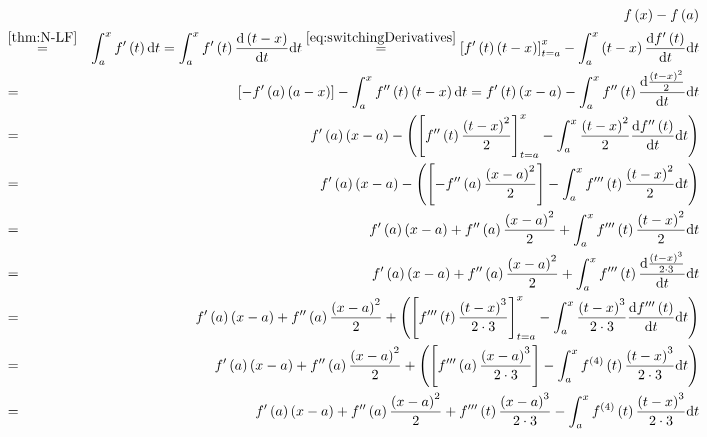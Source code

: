 \documentclass[
]{book}
\theoremstyle{definition}
\theoremstyle{definition}
\theoremstyle{definition}
\theoremstyle{definition}
\theoremstyle{remark}
\begin{document}
\begin{eqnarray}
 &  & f\left(x\right)-f\left(a\right)\\
 & \overset{\ref{thm:N-LF}}{=} & \int_{a}^{x}f'\left(t\right)\mathrm{d}t=\int_{a}^{x}f'\left(t\right)\frac{\mathrm{d}\left(t-x\right)}{\mathrm{d}t}\mathrm{d}t\overset{\ref{eq:switchingDerivatives}}{=}\left[f'\left(t\right)\left(t-x\right)\right]_{t=a}^{x}-\int_{a}^{x}\left(t-x\right)\frac{\mathrm{d}f'\left(t\right)}{\mathrm{d}t}\mathrm{d}t\\
 & = & \left[-f'\left(a\right)\left(a-x\right)\right]-\int_{a}^{x}f''\left(t\right)\left(t-x\right)\mathrm{d}t=f'\left(t\right)\left(x-a\right)-\int_{a}^{x}f''\left(t\right)\frac{\mathrm{d}\frac{\left(t-x\right)^{2}}{2}}{\mathrm{d}t}\mathrm{d}t\\
 & = & f'\left(a\right)\left(x-a\right)-\left(\left[f''\left(t\right)\frac{\left(t-x\right)^{2}}{2}\right]_{t=a}^{x}-\int_{a}^{x}\frac{\left(t-x\right)^{2}}{2}\frac{\mathrm{d}f''\left(t\right)}{\mathrm{d}t}\mathrm{d}t\right)\\
 & = & f'\left(a\right)\left(x-a\right)-\left(\left[-f''\left(a\right)\frac{\left(x-a\right)^{2}}{2}\right]-\int_{a}^{x}f'''\left(t\right)\frac{\left(t-x\right)^{2}}{2}\mathrm{d}t\right)\\
 & = & f'\left(a\right)\left(x-a\right)+f''\left(a\right)\frac{\left(x-a\right)^{2}}{2}+\int_{a}^{x}f'''\left(t\right)\frac{\left(t-x\right)^{2}}{2}\mathrm{d}t\\
 & = & f'\left(a\right)\left(x-a\right)+f''\left(a\right)\frac{\left(x-a\right)^{2}}{2}+\int_{a}^{x}f'''\left(t\right)\frac{\mathrm{d}\frac{\left(t-x\right)^{3}}{2\cdot3}}{\mathrm{d}t}\mathrm{d}t\\
 & = & f'\left(a\right)\left(x-a\right)+f''\left(a\right)\frac{\left(x-a\right)^{2}}{2}+\left(\left[f'''\left(t\right)\frac{\left(t-x\right)^{3}}{2\cdot3}\right]_{t=a}^{x}-\int_{a}^{x}\frac{\left(t-x\right)^{3}}{2\cdot3}\frac{\mathrm{d}f'''\left(t\right)}{\mathrm{d}t}\mathrm{d}t\right)\\
 & = & f'\left(a\right)\left(x-a\right)+f''\left(a\right)\frac{\left(x-a\right)^{2}}{2}+\left(\left[f'''\left(a\right)\frac{\left(x-a\right)^{3}}{2\cdot3}\right]-\int_{a}^{x}f^{\left(4\right)}\left(t\right)\frac{\left(t-x\right)^{3}}{2\cdot3}\mathrm{d}t\right)\\
 & = & f'\left(a\right)\left(x-a\right)+f''\left(a\right)\frac{\left(x-a\right)^{2}}{2}+f'''\left(t\right)\frac{\left(x-a\right)^{3}}{2\cdot3}-\int_{a}^{x}f^{\left(4\right)}\left(t\right)\frac{\left(t-x\right)^{3}}{2\cdot3}\mathrm{d}t\\

\end{eqnarray}
\end{document}

